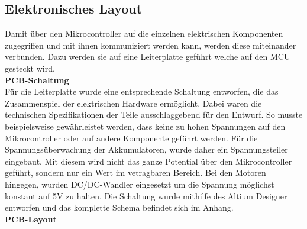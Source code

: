 \subsection{Elektronisches Layout}
Damit über den Mikrocontroller auf die einzelnen elektrischen Komponenten zugegriffen und mit ihnen kommuniziert werden kann, werden diese miteinander verbunden. Dazu werden sie auf eine Leiterplatte geführt welche auf den MCU gesteckt wird.
\\[0.2cm]

\textbf{PCB-Schaltung}\\[0.2cm]
Für die Leiterplatte wurde eine entsprechende Schaltung entworfen, die das Zusammenspiel der elektrischen Hardware ermöglicht. Dabei waren die technischen Spezifikationen der Teile ausschlaggebend für den Entwurf.
So musste beispielsweise gewährleistet werden, dass  keine zu hohen Spannungen auf den Mikrocontroller oder auf andere Komponente geführt werden. Für die Spannungsüberwachung der Akkumulatoren, wurde daher ein Spannungsteiler eingebaut. Mit diesem wird nicht das ganze Potential über den Mikrocontroller geführt, sondern nur ein Wert im vetragbaren Bereich. Bei den Motoren hingegen, wurden DC/DC-Wandler eingesetzt um die Spannung möglichst konstant auf 5V zu halten.
Die Schaltung wurde mithilfe des Altium Designer entworfen und das komplette Schema befindet sich im Anhang.
\\[0.2cm]

\textbf{PCB-Layout}
\\[0.2cm]